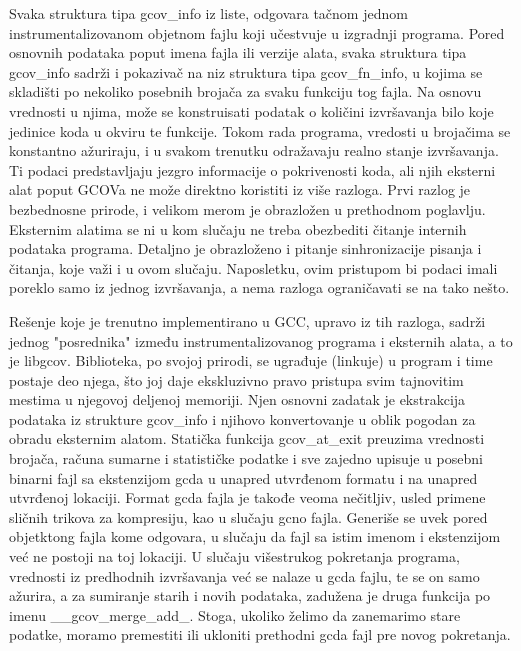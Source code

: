 \documentclass[12pt,oneside]{memoir}
\begin{document}
Svaka struktura tipa gcov\_info iz liste, odgovara tačnom jednom instrumentalizovanom objetnom fajlu koji učestvuje u izgradnji programa. Pored osnovnih podataka poput imena fajla ili verzije alata, svaka struktura tipa gcov\_info sadrži i pokazivač na niz struktura tipa gcov\_fn\_info, u kojima se skladišti po nekoliko posebnih brojača za svaku funkciju tog fajla. Na osnovu vrednosti u njima, može se konstruisati podatak o količini izvršavanja bilo koje jedinice koda u okviru te funkcije. Tokom rada programa, vredosti u brojačima se konstantno ažuriraju, i u svakom trenutku odražavaju realno stanje izvršavanja. Ti podaci predstavljaju jezgro informacije o pokrivenosti koda, ali njih eksterni alat poput GCOVa ne može direktno koristiti iz više razloga. Prvi razlog je bezbednosne prirode, i velikom merom je obrazložen u prethodnom poglavlju. Eksternim alatima se ni u kom slučaju ne treba obezbediti čitanje internih podataka programa. Detaljno je obrazloženo i pitanje sinhronizacije pisanja i čitanja, koje važi i u ovom slučaju. Naposletku, ovim pristupom bi podaci imali poreklo samo iz jednog izvršavanja, a nema razloga ograničavati se na tako nešto. 


Rešenje koje je trenutno implementirano u GCC, upravo iz tih razloga, sadrži jednog "posrednika" između instrumentalizovanog programa i eksternih alata, a to je libgcov. Biblioteka, po svojoj prirodi, se ugrađuje (linkuje) u program i time postaje deo njega, što joj daje ekskluzivno pravo pristupa svim tajnovitim mestima u njegovoj deljenoj memoriji. Njen osnovni zadatak je ekstrakcija podataka iz strukture gcov\_info i njihovo konvertovanje u oblik pogodan za obradu eksternim alatom. Statička funkcija gcov\_at\_exit preuzima vrednosti brojača, računa sumarne i statističke podatke i sve zajedno upisuje u posebni binarni fajl sa ekstenzijom gcda u unapred utvrđenom formatu i na unapred utvrđenoj lokaciji. Format gcda fajla je takođe veoma nečitljiv, usled primene sličnih trikova za kompresiju, kao u slučaju gcno fajla. Generiše se uvek pored objetktong fajla kome odgovara, u slučaju da fajl sa istim imenom i ekstenzijom već ne postoji na toj lokaciji. U slučaju višestrukog pokretanja programa, vrednosti iz predhodnih izvršavanja već se nalaze u gcda fajlu, te se on samo ažurira, a za sumiranje starih i novih podataka, zadužena je druga funkcija po imenu \_\_gcov\_merge\_add\_. Stoga, ukoliko želimo da zanemarimo stare podatke, moramo premestiti ili ukloniti prethodni gcda fajl pre novog pokretanja. 
\end{document}
